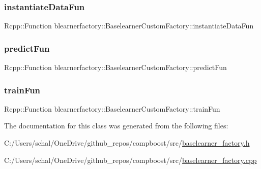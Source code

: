 \subsubsection{\texorpdfstring{instantiate\+Data\+Fun}{instantiateDataFun}}
{\footnotesize\ttfamily Rcpp\+::\+Function blearnerfactory\+::\+Baselearner\+Custom\+Factory\+::instantiate\+Data\+Fun\hspace{0.3cm}{\ttfamily [private]}}

\mbox{\label{classblearnerfactory_1_1_baselearner_custom_factory_ad7bed8ada05584d107edb2346f5d5a2b}} 
\subsubsection{\texorpdfstring{predict\+Fun}{predictFun}}
{\footnotesize\ttfamily Rcpp\+::\+Function blearnerfactory\+::\+Baselearner\+Custom\+Factory\+::predict\+Fun\hspace{0.3cm}{\ttfamily [private]}}

\mbox{\label{classblearnerfactory_1_1_baselearner_custom_factory_ab0d94b2fe7c675252255f791eab3ad7a}} 
\subsubsection{\texorpdfstring{train\+Fun}{trainFun}}
{\footnotesize\ttfamily Rcpp\+::\+Function blearnerfactory\+::\+Baselearner\+Custom\+Factory\+::train\+Fun\hspace{0.3cm}{\ttfamily [private]}}



The documentation for this class was generated from the following files\+:\begin{DoxyCompactItemize}
\item 
C\+:/\+Users/schal/\+One\+Drive/github\+\_\+repos/compboost/src/\mbox{\hyperlink{baselearner__factory_8h}{baselearner\+\_\+factory.\+h}}\item 
C\+:/\+Users/schal/\+One\+Drive/github\+\_\+repos/compboost/src/\mbox{\hyperlink{baselearner__factory_8cpp}{baselearner\+\_\+factory.\+cpp}}\end{DoxyCompactItemize}
